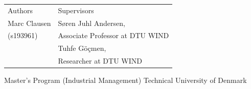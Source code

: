 \begin{titlepage}
\vspace{1cm}


\begin{table}[H]
\begin{adjustwidth}{-0.19cm}{0cm}
    \begin{tabular}{>{\raggedright\arraybackslash}p{}>{\raggedleft\arraybackslash}p{}}
        \LARGE \sffamily Authors & \LARGE \sffamily Supervisors \\
        \large \sffamily Marc Clausen &\large \sffamily  Søren Juhl Andersen, \\
         \large \sffamily(s193961) &  \large \sffamily \hfill Associate Professor at DTU WIND \\
        \large \sffamily   & \large \sffamily  Tuhfe Göçmen, \\
         \large \sffamily  &  \large \sffamily Researcher at DTU WIND 
    \end{tabular}
\end{adjustwidth}
\end{table}

\large \sffamily
Master's Program (Industrial Management) \newline 
Technical University of Denmark

\end{titlepage}